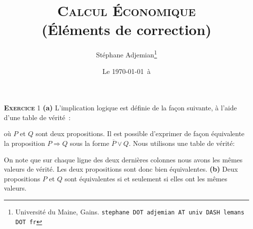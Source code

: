 \documentclass[10pt,a4paper,notitlepage]{article}
\newcommand{\exercice}[1]{\textsc{\textbf{Exercice}} #1}
\begin{document}
\title{\textsc{Calcul Économique}\\\textbf{(Éléments de correction)}}
\author{Stéphane Adjemian\thanks{Université du Maine, Gains. \texttt{stephane DOT adjemian AT univ DASH lemans DOT fr}}}
\date{Le \today\ à \thistime}

\maketitle

\exercice{1} \textbf{(a)} L'implication logique est définie de la façon suivante, à l'aide d'une table de vérité :
\begin{table}[H]
  \centering
{}
\end{table}
où $P$ et $Q$ sont deux propositions. Il est possible d'exprimer de
façon équivalente la proposition $P\Rightarrow Q$ sous la forme
$\overline P \lor Q$. Nous utilisons une table de vérité:
\begin{table}[H]
  \centering
{}
\end{table}
On note que sur chaque ligne des deux dernières colonnes nous avons
les mêmes valeurs de vérité. Les deux propositions sont donc bien
équivalentes. \textbf{(b)} Deux propositions $P$ et $Q$ sont
équivalentes si et seulement si elles ont les mêmes valeurs.
\begin{table}[H]
  \centering
{}
\end{table}
\end{document}
